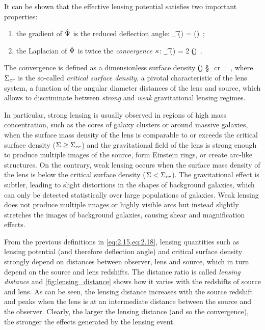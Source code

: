 It can be shown that the effective lensing potential satisfies two important properties:
\begin{enumerate}
    \item the gradient of $\hat{\P}$ is the reduced deflection angle:
    \be
    \label{eq:2.16}
    \va{\nabla}_\t \hat{\P} (\va{\t}) = \va{\a} (\va{\t}) \,;
    \ee

    \item the Laplacian of $\hat{\P}$ is twice the \emph{convergence} $\k$:
    \be
    \label{eq:2.17}
    \laplacian_\t \hat{\P} (\va{\t}) = 2 \k (\va{\t}) \,.
    \ee
\end{enumerate}

The convergence is defined as a dimensionless surface density
\be
\label{eq:2.18}
\k (\va{\t}) \equiv {} \quad {} \quad \S_{cr} =   \;,
\ee
where $\S_{cr}$ is the so-called \emph{critical surface density}, a pivotal characteristic of the lens system, a function of the angular diameter distances of the lens and source, which allows to discriminate between \emph{strong} and \emph{weak} gravitational lensing regimes.

In particular, strong lensing is usually observed in regions of high mass concentration, such as the cores of galaxy clusters or around massive galaxies, when the surface mass density of the lens is comparable to or exceeds the critical surface density ($\S \geq \S_{cr}$) and the gravitational field of the lens is strong enough to produce multiple images of the source, form Einstein rings, or create arc-like structures.
On the contrary, weak lensing occurs when the surface mass density of the lens is below the critical surface density ($\S < \S_{cr}$). The gravitational effect is subtler, leading to slight distortions in the shapes of background galaxies, which can only be detected statistically over large populations of galaxies. Weak lensing does not produce multiple images or highly visible arcs but instead slightly stretches the images of background galaxies, causing shear and magnification effects.

From the previous definitions in \cref{eq:2.15,eq:2.18}, lensing quantities such as lensing potential (and therefore deflection angle) and critical surface density strongly depend on distances between observer, lens and source, which in turn depend on the source and lens redshifts.
The distance ratio
\be
{}
\ee
is called \emph{lensing distance} and \cref{fig:lensing_distance} shows how it varies with the redshifts of source and lens.
As can be seen, the lensing distance increases with the source redshift and peaks when the lens is at an intermediate distance between the source and the observer. Clearly, the larger the lensing distance (and so the convergence), the stronger the effects generated by the lensing event.

